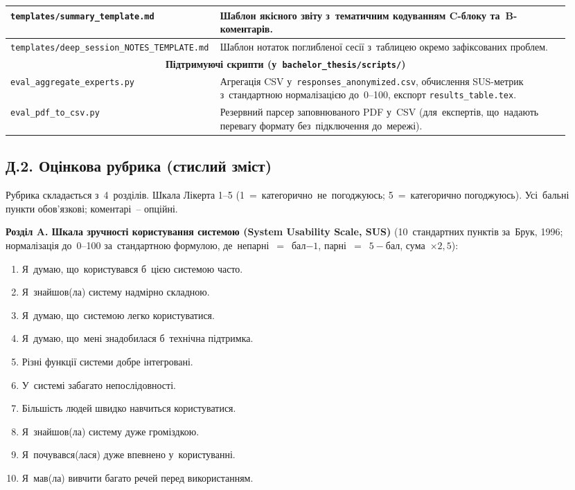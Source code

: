 \begin{table}[htbp]
\begin{tabular}{|p{0.32\linewidth}|p{0.62\linewidth}|}
\hline
\texttt{templates/summary\_template.md} & Шаблон якісного звіту з~тематичним кодуванням C-блоку та~B-коментарів. \\
\hline
\texttt{templates/deep\_session\_NOTES\_TEMPLATE.md} & Шаблон нотаток поглибленої сесії з~таблицею окремо зафіксованих проблем. \\
\hline
\multicolumn{2}{|c|}{\textbf{Підтримуючі скрипти (у~\texttt{bachelor\_thesis/scripts/})}} \\
\hline
\texttt{eval\_aggregate\_experts.py} & Агрегація CSV у~\texttt{responses\_anonymized.csv}, обчислення SUS-метрик з~стандартною нормалізацією до~0--100, експорт \texttt{results\_table.tex}. \\
\hline
\texttt{eval\_pdf\_to\_csv.py} & Резервний парсер заповнюваного PDF у~CSV (для~експертів, що~надають перевагу формату без~підключення до~мережі). \\
\hline
\end{tabular}
\end{table}

\subsection*{Д.2. Оцінкова рубрика (стислий зміст)}
\label{app:eval-rubric}

Рубрика складається з~4~розділів. Шкала Лікерта 1--5 (1~=~категорично~не~погоджуюсь; 5~=~категорично погоджуюсь). Усі~бальні пункти обов'язкові; коментарі~-- опційні.

\textbf{Розділ A. Шкала зручності користування системою (System Usability Scale, SUS)} (10~стандартних пунктів за~Брук, 1996; нормалізація до~0--100 за~стандартною формулою, де~непарні~$=$~бал$-1$, парні~$=$~$5-$бал, сума~$\times 2{,}5$):

\begin{enumerate}[noitemsep,topsep=2pt,leftmargin=*]
    \item Я~думаю, що~користувався б~цією системою часто.
    \item Я~знайшов(ла) систему надмірно складною.
    \item Я~думаю, що~системою легко користуватися.
    \item Я~думаю, що~мені знадобилася б~технічна підтримка.
    \item Різні функції системи добре інтегровані.
    \item У~системі забагато непослідовності.
    \item Більшість людей швидко навчиться користуватися.
    \item Я~знайшов(ла) систему дуже громіздкою.
    \item Я~почувався(лася) дуже впевнено у~користуванні.
    \item Я~мав(ла) вивчити багато речей перед використанням.
\end{enumerate}

